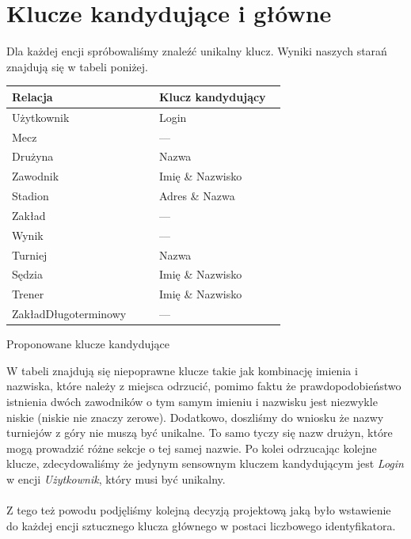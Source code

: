 \documentclass{mwrep}
\begin{document}
\section{Klucze kandydujące i główne}

Dla każdej encji spróbowaliśmy znaleźć unikalny klucz. Wyniki naszych starań znajdują się w
tabeli poniżej.

\vspace{1cm}
\begin{threeparttable}[H]
	\begin{tabular}{|p{0.5\linewidth}|p{0.43\linewidth}|}
	\hline
	Relacja & Klucz kandydujący \\ \hline
	Użytkownik & Login \\ \hline
	Mecz &  \hfil--- \\ \hline
	Drużyna &  Nazwa \\ \hline
	Zawodnik &  Imię \& Nazwisko \\ \hline
	Stadion &  Adres \& Nazwa \\ \hline
	Zakład &  \hfil--- \\ \hline
	Wynik &  \hfil--- \\ \hline
	Turniej &  Nazwa \\ \hline
	Sędzia & Imię \& Nazwisko \\ \hline
	Trener & Imię \& Nazwisko \\ \hline
	ZakładDługoterminowy &  \hfil--- \\ \hline
	\end{tabular}	
	\caption{Proponowane klucze kandydujące}
\end{threeparttable}
\vspace{1cm}

W tabeli znajdują się niepoprawne klucze takie jak kombinację imienia i nazwiska, które należy z miejsca odrzucić, pomimo faktu że prawdopodobieństwo
istnienia dwóch zawodników o tym samym imieniu i nazwisku jest niezwykle niskie (niskie nie znaczy zerowe). 
Dodatkowo, doszliśmy do wniosku że nazwy turniejów z góry nie muszą być unikalne. To samo tyczy się nazw drużyn, które mogą
prowadzić różne sekcje o tej samej nazwie. Po kolei odrzucając kolejne klucze, zdecydowaliśmy że jedynym sensownym kluczem kandydującym
jest \emph{Login} w encji \emph{Użytkownik}, który musi być unikalny. \\
\\
Z tego też powodu podjęliśmy kolejną decyzją projektową jaką było wstawienie do każdej encji sztucznego klucza głównego 
w postaci liczbowego identyfikatora. 
\end{document}
